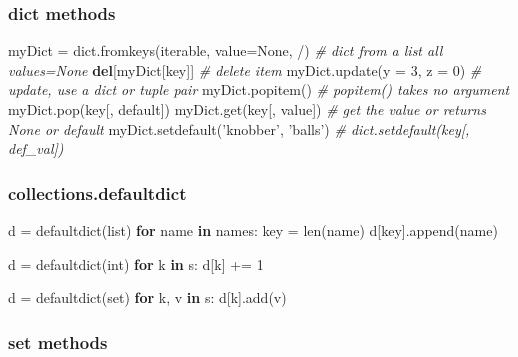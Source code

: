 \documentclass[11pt]{article}
\newenvironment{Shaded}{}{}
\newcommand{\KeywordTok}[1]{\textcolor[rgb]{0.00,0.44,0.13}{\textbf{{#1}}}}
\newcommand{\DecValTok}[1]{\textcolor[rgb]{0.25,0.63,0.44}{{#1}}}
\newcommand{\StringTok}[1]{\textcolor[rgb]{0.25,0.44,0.63}{{#1}}}
\newcommand{\CommentTok}[1]{\textcolor[rgb]{0.38,0.63,0.69}{\textit{{#1}}}}
\newcommand{\NormalTok}[1]{{#1}}
\newcommand{\VariableTok}[1]{\textcolor[rgb]{0.10,0.09,0.49}{{#1}}}
\newcommand{\ControlFlowTok}[1]{\textcolor[rgb]{0.00,0.44,0.13}{\textbf{{#1}}}}
\newcommand{\OperatorTok}[1]{\textcolor[rgb]{0.40,0.40,0.40}{{#1}}}
\newcommand{\BuiltInTok}[1]{{#1}}
\begin{document}
\subsubsection{dict methods}\label{dict-methods}

\begin{Shaded}
\begin{Highlighting}[]
\NormalTok{myDict }\OperatorTok{=} \BuiltInTok{dict}\NormalTok{.fromkeys(iterable, value}\OperatorTok{=}\VariableTok{None}\NormalTok{, }\OperatorTok{/}\NormalTok{) }\CommentTok{# dict from a list all values=None}
\KeywordTok{del}\NormalTok{[myDict[key]] }\CommentTok{# delete item}
\NormalTok{myDict.update(y }\OperatorTok{=} \DecValTok{3}\NormalTok{, z }\OperatorTok{=} \DecValTok{0}\NormalTok{) }\CommentTok{# update, use a dict or tuple pair}
\NormalTok{myDict.popitem() }\CommentTok{# popitem() takes no argument}
\NormalTok{myDict.pop(key[, default])}
\NormalTok{myDict.get(key[, value]) }\CommentTok{# get the value or returns None or default}
\NormalTok{myDict.setdefault(}\StringTok{'knobber'}\NormalTok{, }\StringTok{'balls'}\NormalTok{) }\CommentTok{# dict.setdefault(key[, def_val])}
\end{Highlighting}
\end{Shaded}

\subsubsection{collections.defaultdict}\label{collections.defaultdict}

\begin{Shaded}
\begin{Highlighting}[]
\NormalTok{d }\OperatorTok{=}\NormalTok{ defaultdict(}\BuiltInTok{list}\NormalTok{)}
\ControlFlowTok{for}\NormalTok{ name }\KeywordTok{in}\NormalTok{ names:}
\NormalTok{    key }\OperatorTok{=} \BuiltInTok{len}\NormalTok{(name)}
\NormalTok{    d[key].append(name)}
    
\NormalTok{d }\OperatorTok{=}\NormalTok{ defaultdict(}\BuiltInTok{int}\NormalTok{)}
\ControlFlowTok{for}\NormalTok{ k }\KeywordTok{in}\NormalTok{ s:}
\NormalTok{    d[k] }\OperatorTok{+=} \DecValTok{1}
    
\NormalTok{d }\OperatorTok{=}\NormalTok{ defaultdict(}\BuiltInTok{set}\NormalTok{)}
\ControlFlowTok{for}\NormalTok{ k, v }\KeywordTok{in}\NormalTok{ s:}
\NormalTok{    d[k].add(v)}
\end{Highlighting}
\end{Shaded}

\subsubsection{set methods}\label{set-methods}
\end{document}
